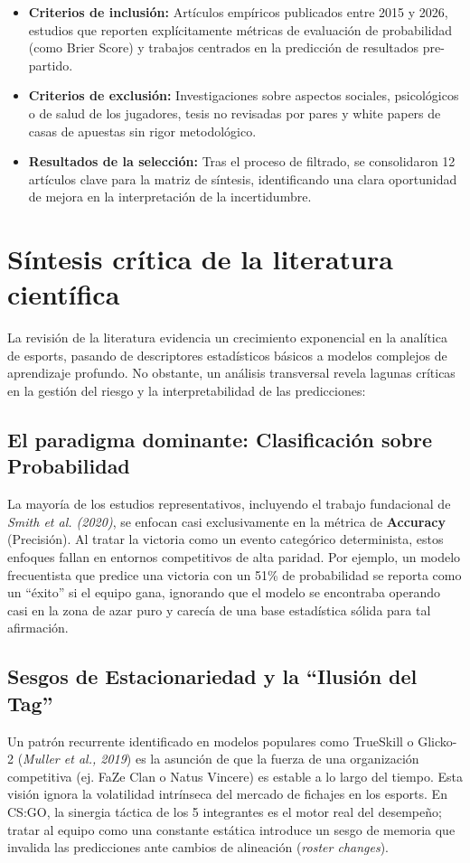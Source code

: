 \documentclass[12pt,a4paper]{article}
\begin{document}
\begin{itemize}[noitemsep]
    \item \textbf{Criterios de inclusión:} Artículos empíricos publicados entre 2015 y 2026, estudios que reporten explícitamente métricas de evaluación de probabilidad (como Brier Score) y trabajos centrados en la predicción de resultados pre-partido.
    \item \textbf{Criterios de exclusión:} Investigaciones sobre aspectos sociales, psicológicos o de salud de los jugadores, tesis no revisadas por pares y white papers de casas de apuestas sin rigor metodológico.
    \item \textbf{Resultados de la selección:} Tras el proceso de filtrado, se consolidaron 12 artículos clave para la matriz de síntesis, identificando una clara oportunidad de mejora en la interpretación de la incertidumbre.
\end{itemize}

\section{Síntesis crítica de la literatura científica}

La revisión de la literatura evidencia un crecimiento exponencial en la analítica de esports, pasando de descriptores estadísticos básicos a modelos complejos de aprendizaje profundo. No obstante, un análisis transversal revela lagunas críticas en la gestión del riesgo y la interpretabilidad de las predicciones:

\subsection{El paradigma dominante: Clasificación sobre Probabilidad}
La mayoría de los estudios representativos, incluyendo el trabajo fundacional de \textit{Smith et al. (2020)}, se enfocan casi exclusivamente en la métrica de \textbf{Accuracy} (Precisión). Al tratar la victoria como un evento categórico determinista, estos enfoques fallan en entornos competitivos de alta paridad. Por ejemplo, un modelo frecuentista que predice una victoria con un 51\% de probabilidad se reporta como un ``éxito'' si el equipo gana, ignorando que el modelo se encontraba operando casi en la zona de azar puro y carecía de una base estadística sólida para tal afirmación.

\subsection{Sesgos de Estacionariedad y la ``Ilusión del Tag''}
Un patrón recurrente identificado en modelos populares como TrueSkill o Glicko-2 (\textit{Muller et al., 2019}) es la asunción de que la fuerza de una organización competitiva (ej. FaZe Clan o Natus Vincere) es estable a lo largo del tiempo. Esta visión ignora la volatilidad intrínseca del mercado de fichajes en los esports. En CS:GO, la sinergia táctica de los 5 integrantes es el motor real del desempeño; tratar al equipo como una constante estática introduce un sesgo de memoria que invalida las predicciones ante cambios de alineación (\textit{roster changes}).
\end{document}
